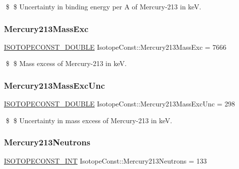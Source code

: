 \$ \$ Uncertainty in binding energy per A of Mercury-\/213 in keV. \mbox{\label{group___isotope_const-_mercury-_hg213_ga7016fce1d8637ceaa5c65c9c4dd49ef5}} 
\subsubsection{\texorpdfstring{Mercury213\+Mass\+Exc}{Mercury213MassExc}}
{\footnotesize\ttfamily \mbox{\hyperlink{group___isotope_const-_macros_ga8f45a7272ce02c0b4c65c44636ed719a}{I\+S\+O\+T\+O\+P\+E\+C\+O\+N\+S\+T\+\_\+\+D\+O\+U\+B\+LE}} Isotope\+Const\+::\+Mercury213\+Mass\+Exc = 7666}

\$ \$ Mass excess of Mercury-\/213 in keV. \mbox{\label{group___isotope_const-_mercury-_hg213_ga5ec4446e595d22c5239608055bf6a8e7}} 
\subsubsection{\texorpdfstring{Mercury213\+Mass\+Exc\+Unc}{Mercury213MassExcUnc}}
{\footnotesize\ttfamily \mbox{\hyperlink{group___isotope_const-_macros_ga8f45a7272ce02c0b4c65c44636ed719a}{I\+S\+O\+T\+O\+P\+E\+C\+O\+N\+S\+T\+\_\+\+D\+O\+U\+B\+LE}} Isotope\+Const\+::\+Mercury213\+Mass\+Exc\+Unc = 298}

\$ \$ Uncertainty in mass excess of Mercury-\/213 in keV. \mbox{\label{group___isotope_const-_mercury-_hg213_ga74a5491dc4ed3c2840c2fe99a65b7a6e}} 
\subsubsection{\texorpdfstring{Mercury213\+Neutrons}{Mercury213Neutrons}}
{\footnotesize\ttfamily \mbox{\hyperlink{group___isotope_const-_macros_ga5f18360b3e99483a35c32d789e62621c}{I\+S\+O\+T\+O\+P\+E\+C\+O\+N\+S\+T\+\_\+\+I\+NT}} Isotope\+Const\+::\+Mercury213\+Neutrons = 133}

